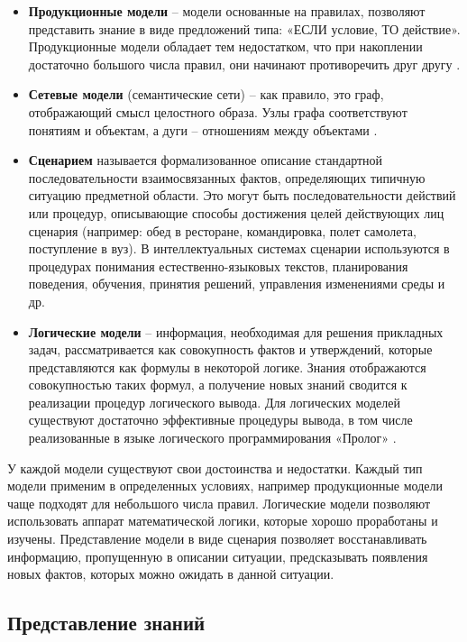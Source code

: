 \begin{itemize}
	\item \textbf{Продукционные модели} -- модели основанные на правилах, позволяют представить знание в виде предложений типа: «ЕСЛИ условие, ТО действие». Продукционные модели обладает тем недостатком, что при накоплении достаточно большого числа правил, они начинают противоречить друг другу \cite{air-models}.
	
	\item \textbf{Сетевые модели} (семантические сети) -- как правило, это граф, отображающий смысл целостного образа. Узлы графа соответствуют понятиям и объектам, а дуги – отношениям между объектами \cite{air-models}.
	
	\item \textbf{Сценарием} называется формализованное описание стандартной последовательности взаимосвязанных фактов, определяющих типичную ситуацию предметной области. Это могут быть последовательности действий или процедур, описывающие способы достижения целей действующих лиц сценария (например: обед в ресторане, командировка, полет самолета, поступление в вуз). В интеллектуальных системах сценарии используются в процедурах понимания естественно-языковых текстов, планирования поведения, обучения, принятия решений, управления изменениями среды и др. \cite{scenario}
	
	\item \textbf{Логические модели} -- информация, необходимая для решения прикладных задач, рассматривается как совокупность фактов и утверждений, которые представляются как формулы в некоторой логике. Знания отображаются совокупностью таких формул, а получение новых знаний сводится к реализации процедур логического вывода. Для логических моделей существуют достаточно эффективные процедуры вывода, в том числе реализованные в языке логического программирования «Пролог» \cite{logic-models}.
\end{itemize}

У каждой модели существуют свои достоинства и недостатки. Каждый тип модели применим в определенных условиях, например продукционные модели чаще подходят для небольшого числа правил. Логические модели позволяют использовать аппарат математической логики, которые хорошо проработаны и изучены. Представление модели в виде сценария позволяет восстанавливать информацию, пропущенную в описании ситуации, предсказывать появления новых фактов, которых можно ожидать в данной ситуации.

\subsection{Представление знаний}

